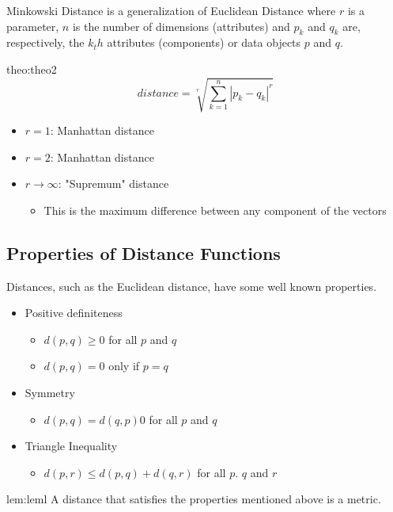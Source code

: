 Minkowski Distance is a generalization of Euclidean Distance where
$r$ is a parameter, $n$ is the number of dimensions (attributes) and $p_k$ and $q_k$ are, 
respectively, the $k_th$ attributes (components) or data objects $p$ and $q$.

\begin{theo}{theo:theo2}
\label{eq:minkowski-distance}
    \[
        distance = \sqrt[r]{\sum_{k=1}^{n}|p_k-q_k|^r}
    \]
\end{theo}

\begin{itemize}
    \item $r = 1$: Manhattan distance
    \item $r = 2$: Manhattan distance
    \item $r \rightarrow \infty$: "Supremum" distance
    \begin{itemize}
        \item This is the maximum difference between any component of the vectors
    \end{itemize}
\end{itemize}

\subsection{Properties of Distance Functions}
Distances, such as the Euclidean distance, have some well known properties.
\begin{itemize}
    \item Positive definiteness
    \begin{itemize}
        \item $d(p, q) \geq 0$ for all $p$ and $q$
        \item $d(p, q) = 0$ only if $p = q$
    \end{itemize}
    \item Symmetry
    \begin{itemize}
        \item $d(p, q) = d(q, p) 0$ for all $p$ and $q$
    \end{itemize}
    \item Triangle Inequality
    \begin{itemize}
        \item $d(p, r) \leq d(p, q) + d(q, r)$ for all $p$. $q$ and $r$
    \end{itemize}
\end{itemize}

\begin{lem}[Metric]{lem:leml}
    A distance that satisfies the properties mentioned above is a metric.
\end{lem}

